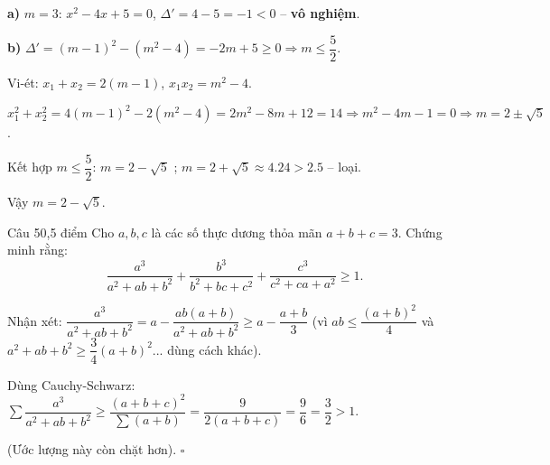 \begin{loi_giai_cau}
\textbf{a)} $m=3$: $x^2-4x+5=0$, $\Delta'=4-5=-1<0$ -- \textbf{vô nghiệm}.

\textbf{b)} $\Delta'=(m-1)^2-(m^2-4)=-2m+5\ge0 \Rightarrow m\le\dfrac{5}{2}$.

Vi-ét: $x_1+x_2=2(m-1)$, $x_1x_2=m^2-4$.

$x_1^2+x_2^2=4(m-1)^2-2(m^2-4)=2m^2-8m+12=14 \Rightarrow m^2-4m-1=0 \Rightarrow m=2\pm\sqrt{5}$.

Kết hợp $m\le\dfrac{5}{2}$: $m=2-\sqrt{5}$ \checkmark ; $m=2+\sqrt{5}\approx4.24>2.5$ -- loại.

Vậy $\boxed{m = 2-\sqrt{5}}$.
\end{loi_giai_cau}

\begin{de_cau}{Câu 5}{0,5 điểm}
Cho $a, b, c$ là các số thực dương thỏa mãn $a + b + c = 3$. Chứng minh rằng:
\[\dfrac{a^3}{a^2+ab+b^2} + \dfrac{b^3}{b^2+bc+c^2} + \dfrac{c^3}{c^2+ca+a^2} \ge 1.\]
\end{de_cau}

\begin{loi_giai_cau}
Nhận xét: $\dfrac{a^3}{a^2+ab+b^2} = a - \dfrac{ab(a+b)}{a^2+ab+b^2} \ge a - \dfrac{a+b}{3}$ (vì $ab\le\dfrac{(a+b)^2}{4}$ và $a^2+ab+b^2\ge\dfrac{3}{4}(a+b)^2$... dùng cách khác).

Dùng Cauchy-Schwarz: $\sum\dfrac{a^3}{a^2+ab+b^2}\ge\dfrac{(a+b+c)^2}{\sum(a+b)}=\dfrac{9}{2(a+b+c)}=\dfrac{9}{6}=\dfrac{3}{2}>1$.

(Ước lượng này còn chặt hơn). $\square$
\end{loi_giai_cau}
